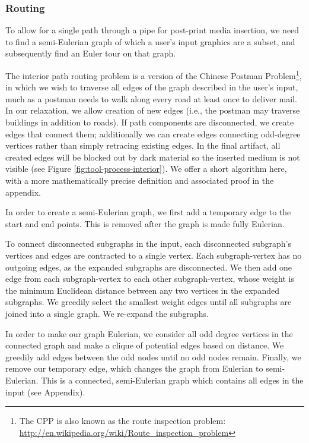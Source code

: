 \subsubsection{Routing}
To allow for a single path through a pipe for post-print media insertion, we need to find a semi-Eulerian graph of which a user's input graphics are a subset, and subsequently find an Euler tour on that graph.

The interior path routing problem is a version of the Chinese Postman Problem\footnote{The CPP is also known as the route inspection problem: \url{http://en.wikipedia.org/wiki/Route_inspection_problem}}, in which we wish to traverse all edges of the graph described in the user's input, much as a postman needs to walk along every road at least once to deliver mail.  In our relaxation, we allow creation of new edges (i.e., the postman may traverse buildings in addition to roads).  If path components are disconnected, we create edges that connect them; additionally we can create edges connecting odd-degree vertices rather than simply retracing existing edges.  In the final artifact, all created edges will be blocked out by dark material so the inserted medium is not visible (see Figure \ref{fig:tool-process-interior}).  We offer a short algorithm here, with a more mathematically precise definition and associated proof in the appendix.

In order to create a semi-Eulerian graph, we first add a temporary edge to the start and end points.  This is removed after the graph is made fully Eulerian.

To connect disconnected subgraphs in the input, each disconnected subgraph's vertices and edges are contracted to a single vertex.  Each subgraph-vertex has no outgoing edges, as the expanded subgraphs are disconnected.  We then add one edge from each subgraph-vertex to each other subgraph-vertex, whose weight is the minimum Euclidean distance between any two vertices in the expanded subgraphs.  We greedily select the smallest weight edges until all subgraphs are joined into a single graph.  We re-expand the subgraphs.

In order to make our graph Eulerian, we consider all odd degree vertices in the connected graph and make a clique of potential edges based on distance.  We greedily add edges between the odd nodes until no odd nodes remain.  Finally, we remove our temporary edge, which changes the graph from Eulerian to semi-Eulerian.  This is a connected, semi-Eulerian graph which contains all edges in the input (see Appendix).


